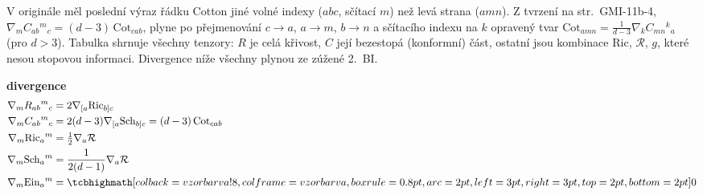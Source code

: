\begin{vysvetleni}
V originále měl poslední výraz řádku Cotton jiné volné indexy ($abc$, sčítací $m$) než levá strana ($amn$). Z tvrzení na str.~GMI-11b-4, $\nabla_m C_{ab}{}^{m}{}_{c}=(d-3)\,\mathrm{Cot}_{cab}$, plyne po přejmenování $c\to a$, $a\to m$, $b\to n$ a sčítacího indexu na $k$ opravený tvar $\mathrm{Cot}_{amn}=\frac{1}{d-3}\nabla_k C_{mn}{}^{k}{}_{a}$ (pro $d>3$).
Tabulka shrnuje všechny tenzory: $R$ je celá křivost, $C$ její bezestopá (konformní) část, ostatní jsou kombinace $\mathrm{Ric}$, $\mathcal{R}$, $g$, které nesou stopovou informaci. Divergence níže všechny plynou ze zúžené 2.\ BI.
\end{vysvetleni}

\textbf{divergence}
\begin{align*}
  \nabla_m R_{ab}{}^{m}{}_{c} &= 2\nabla_{[a}\mathrm{Ric}_{b]c} \\
  \nabla_m C_{ab}{}^{m}{}_{c} &= 2(d-3)\nabla_{[a}\mathrm{Sch}_{b]c} = (d-3)\,\mathrm{Cot}_{cab} \\
  \nabla_m\mathrm{Ric}_a{}^{m} &= \tfrac12\nabla_a\mathcal{R} \\
  \nabla_m\mathrm{Sch}_a{}^{m} &= \frac{1}{2(d-1)}\nabla_a\mathcal{R} \\
  \nabla_m\mathrm{Ein}_a{}^{m} &= \vzorec{0}
\end{align*}

